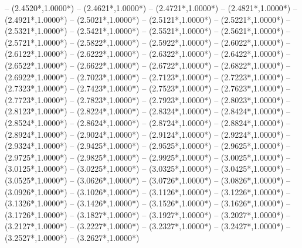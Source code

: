 {	-- ({2.4520*\dx},{1.0000*\dy})
	-- ({2.4621*\dx},{1.0000*\dy})
	-- ({2.4721*\dx},{1.0000*\dy})
	-- ({2.4821*\dx},{1.0000*\dy})
	-- ({2.4921*\dx},{1.0000*\dy})
	-- ({2.5021*\dx},{1.0000*\dy})
	-- ({2.5121*\dx},{1.0000*\dy})
	-- ({2.5221*\dx},{1.0000*\dy})
	-- ({2.5321*\dx},{1.0000*\dy})
	-- ({2.5421*\dx},{1.0000*\dy})
	-- ({2.5521*\dx},{1.0000*\dy})
	-- ({2.5621*\dx},{1.0000*\dy})
	-- ({2.5721*\dx},{1.0000*\dy})
	-- ({2.5822*\dx},{1.0000*\dy})
	-- ({2.5922*\dx},{1.0000*\dy})
	-- ({2.6022*\dx},{1.0000*\dy})
	-- ({2.6122*\dx},{1.0000*\dy})
	-- ({2.6222*\dx},{1.0000*\dy})
	-- ({2.6322*\dx},{1.0000*\dy})
	-- ({2.6422*\dx},{1.0000*\dy})
	-- ({2.6522*\dx},{1.0000*\dy})
	-- ({2.6622*\dx},{1.0000*\dy})
	-- ({2.6722*\dx},{1.0000*\dy})
	-- ({2.6822*\dx},{1.0000*\dy})
	-- ({2.6922*\dx},{1.0000*\dy})
	-- ({2.7023*\dx},{1.0000*\dy})
	-- ({2.7123*\dx},{1.0000*\dy})
	-- ({2.7223*\dx},{1.0000*\dy})
	-- ({2.7323*\dx},{1.0000*\dy})
	-- ({2.7423*\dx},{1.0000*\dy})
	-- ({2.7523*\dx},{1.0000*\dy})
	-- ({2.7623*\dx},{1.0000*\dy})
	-- ({2.7723*\dx},{1.0000*\dy})
	-- ({2.7823*\dx},{1.0000*\dy})
	-- ({2.7923*\dx},{1.0000*\dy})
	-- ({2.8023*\dx},{1.0000*\dy})
	-- ({2.8123*\dx},{1.0000*\dy})
	-- ({2.8224*\dx},{1.0000*\dy})
	-- ({2.8324*\dx},{1.0000*\dy})
	-- ({2.8424*\dx},{1.0000*\dy})
	-- ({2.8524*\dx},{1.0000*\dy})
	-- ({2.8624*\dx},{1.0000*\dy})
	-- ({2.8724*\dx},{1.0000*\dy})
	-- ({2.8824*\dx},{1.0000*\dy})
	-- ({2.8924*\dx},{1.0000*\dy})
	-- ({2.9024*\dx},{1.0000*\dy})
	-- ({2.9124*\dx},{1.0000*\dy})
	-- ({2.9224*\dx},{1.0000*\dy})
	-- ({2.9324*\dx},{1.0000*\dy})
	-- ({2.9425*\dx},{1.0000*\dy})
	-- ({2.9525*\dx},{1.0000*\dy})
	-- ({2.9625*\dx},{1.0000*\dy})
	-- ({2.9725*\dx},{1.0000*\dy})
	-- ({2.9825*\dx},{1.0000*\dy})
	-- ({2.9925*\dx},{1.0000*\dy})
	-- ({3.0025*\dx},{1.0000*\dy})
	-- ({3.0125*\dx},{1.0000*\dy})
	-- ({3.0225*\dx},{1.0000*\dy})
	-- ({3.0325*\dx},{1.0000*\dy})
	-- ({3.0425*\dx},{1.0000*\dy})
	-- ({3.0525*\dx},{1.0000*\dy})
	-- ({3.0626*\dx},{1.0000*\dy})
	-- ({3.0726*\dx},{1.0000*\dy})
	-- ({3.0826*\dx},{1.0000*\dy})
	-- ({3.0926*\dx},{1.0000*\dy})
	-- ({3.1026*\dx},{1.0000*\dy})
	-- ({3.1126*\dx},{1.0000*\dy})
	-- ({3.1226*\dx},{1.0000*\dy})
	-- ({3.1326*\dx},{1.0000*\dy})
	-- ({3.1426*\dx},{1.0000*\dy})
	-- ({3.1526*\dx},{1.0000*\dy})
	-- ({3.1626*\dx},{1.0000*\dy})
	-- ({3.1726*\dx},{1.0000*\dy})
	-- ({3.1827*\dx},{1.0000*\dy})
	-- ({3.1927*\dx},{1.0000*\dy})
	-- ({3.2027*\dx},{1.0000*\dy})
	-- ({3.2127*\dx},{1.0000*\dy})
	-- ({3.2227*\dx},{1.0000*\dy})
	-- ({3.2327*\dx},{1.0000*\dy})
	-- ({3.2427*\dx},{1.0000*\dy})
	-- ({3.2527*\dx},{1.0000*\dy})
	-- ({3.2627*\dx},{1.0000*\dy})
}
